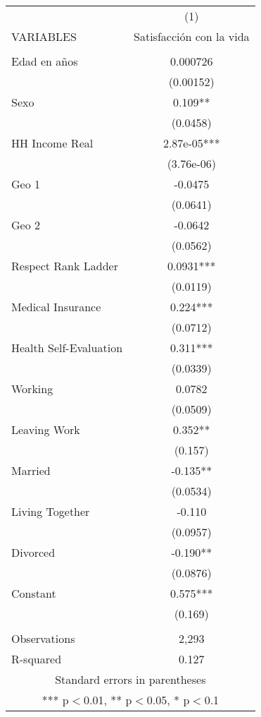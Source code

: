 \documentclass[]{article}
\begin{document}
\begin{tabular}{lc} \hline
 & (1) \\
VARIABLES & Satisfacción con la vida \\ \hline
 &  \\
Edad en años & 0.000726 \\
 & (0.00152) \\
Sexo & 0.109** \\
 & (0.0458) \\
HH Income Real & 2.87e-05*** \\
 & (3.76e-06) \\
Geo 1 & -0.0475 \\
 & (0.0641) \\
Geo 2 & -0.0642 \\
 & (0.0562) \\
Respect Rank Ladder & 0.0931*** \\
 & (0.0119) \\
Medical Insurance & 0.224*** \\
 & (0.0712) \\
Health Self-Evaluation & 0.311*** \\
 & (0.0339) \\
Working & 0.0782 \\
 & (0.0509) \\
Leaving Work & 0.352** \\
 & (0.157) \\
Married & -0.135** \\
 & (0.0534) \\
Living Together & -0.110 \\
 & (0.0957) \\
Divorced & -0.190** \\
 & (0.0876) \\
Constant & 0.575*** \\
 & (0.169) \\
 &  \\
Observations & 2,293 \\
 R-squared & 0.127 \\ \hline
\multicolumn{2}{c}{ Standard errors in parentheses} \\
\multicolumn{2}{c}{ *** p$<$0.01, ** p$<$0.05, * p$<$0.1} \\
\end{tabular}
\end{document}
